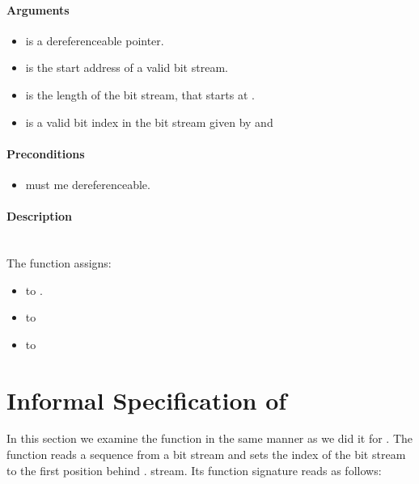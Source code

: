 \paragraph{Arguments}
\begin{itemize}
   \item  {} is a dereferenceable pointer.
   \item {} is  the start address of a valid bit stream.
   \item {} is the length of the bit stream, that starts at .
   \item {} is a valid bit index in the bit stream given by  and 
\end{itemize}

\paragraph{Preconditions}
\begin{itemize}
    \item  {} must me dereferenceable.
\end{itemize}

\paragraph{Description}\hfill\\\hfill
The function \init assigns:
\begin{itemize}
    \item {}  to .
    \item {} to 
    \item {} to 
\end{itemize}

\clearpage

\section{Informal Specification of }

In this section we examine the function \peeknext in the same manner as we did it for \init.
The function \peeknext reads a sequence from a bit stream  and sets the index of the bit stream  to the first position behind .
stream. Its function signature reads as follows:


